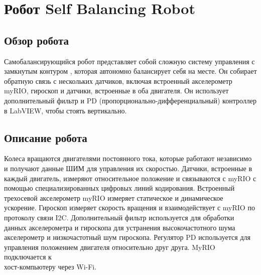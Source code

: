\section{Робот Self Balancing Robot}
\subsection{Обзор робота}
Самобалансирующийся робот представляет собой сложную систему управления с замкнутым контуром
, которая автономно балансирует себя на месте. Он собирает обратную
связь с нескольких датчиков, включая встроенный акселерометр
myRIO, гироскоп и датчики, встроенные в оба двигателя. Он использует
дополнительный фильтр и PD (пропорционально-дифференциальный) контроллер
в LabVIEW, чтобы стоять вертикально.

\subsection{Описание робота}
Колеса вращаются двигателями постоянного тока, которые работают
независимо и получают данные ШИМ для управления их скоростью.
Датчики, встроенные в каждый двигатель, измеряют относительное
положение и связываются с myRIO с помощью специализированных
цифровых линий кодирования.
Встроенный трехосевой акселерометр myRIO измеряет
статическое и динамическое ускорение.
Гироскоп измеряет скорость вращения и
взаимодействует с myRIO по
протоколу связи I2C.
Дополнительный фильтр используется для обработки данных акселерометра и гироскопа для устранения высокочастотного шума
акселерометр и низкочастотный шум гироскопа.
Регулятор PD используется для управления положением двигателя относительно друг друга.
MyRIO подключается к \\
хост-компьютеру через Wi-Fi.

\newpage
